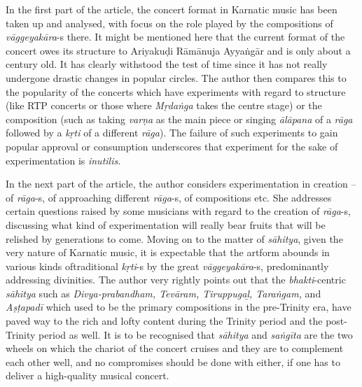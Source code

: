 In the first part of the article, the concert format in Karnatic music has been taken up and analysed, with focus on the role played by the compositions of \textit{vāggeyakāra}-s there. It might be mentioned here that the current format of the concert owes its structure to Ariyakuḍi Rāmānuja Ayyaṅgār and is only about a century old. It has clearly withstood the test of time since it has not really undergone drastic changes in popular circles. The author then compares this to the popularity of the concerts which have experiments with regard to structure (like RTP concerts or those where \textit{Mṛdaṅga} takes the centre stage) or the composition (such as taking \textit{varṇa} as the main piece or singing \textit{ālāpana} of a \textit{rāga} followed by a \textit{kṛti} of a different \textit{rāga}). The failure of such experiments to gain popular approval or consumption underscores that experiment for the sake of experimentation is \textit{inutilis}.

In the next part of the article, the author considers experimentation in creation – of \textit{rāga}-s, of approaching different \textit{rāga}-s, of compositions etc. She addresses certain questions raised by some musicians with regard to the creation of \textit{rāga}-s, discussing what kind of experimentation will really bear fruits that will be relished by generations to come. Moving on to the matter of \textit{sāhitya}, given the very nature of Karnatic music, it is expectable that the artform abounds in various kinds of\break traditional \textit{kṛti}-s by the great \textit{vāggeyakāra}-s, predominantly addressing divinities. The author very rightly points out that the \textit{bhakti}-centric \textit{sāhitya} such as \textit{Divya-prabandham, Tevāram, Tiruppugaḻ, Taraṅgam, }and\textit{ Aṣṭapadī} which used to be the primary compositions in the pre-Trinity era, have paved way to the rich and lofty content during the Trinity period and the post-Trinity period as well. It is to be recognised that \textit{sāhitya} and \textit{saṅgīta} are the two wheels on which the chariot of the concert cruises and they are to complement each other well, and no compromises should be done with either, if one has to deliver a high-quality musical concert.

